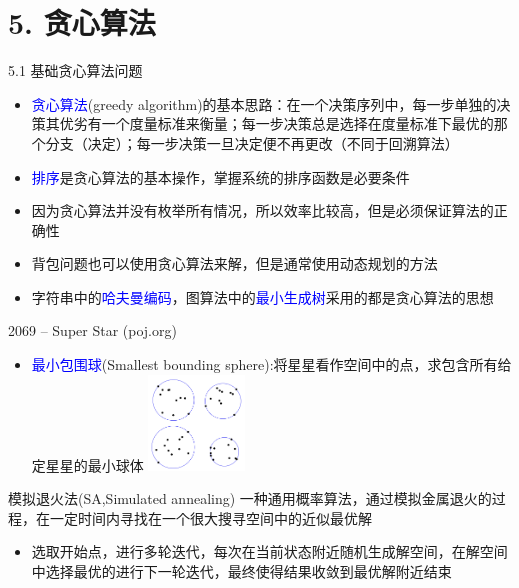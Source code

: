 


\frame{\titlepage}
\section{5. 贪心算法}
\begin{frame}{5.1 基础贪心算法问题}
    \begin{itemize}
        \item \textcolor{blue}{贪心算法}(greedy algorithm)的基本思路：在一个决策序列中，每一步单独的决策其优劣有一个度量标准来衡量；每一步决策总是选择在度量标准下最优的那个分支（决定）；每一步决策一旦决定便不再更改（不同于回溯算法）
        \item \textcolor{blue}{排序}是贪心算法的基本操作，掌握系统的排序函数是必要条件
        \item 因为贪心算法并没有枚举所有情况，所以效率比较高，但是必须保证算法的正确性
        \item 背包问题也可以使用贪心算法来解，但是通常使用动态规划的方法
        \item 字符串中的\textcolor{blue}{哈夫曼编码}，图算法中的\textcolor{blue}{最小生成树}采用的都是贪心算法的思想
    \end{itemize}
\end{frame}
\begin{frame}{2069 -- Super Star (poj.org)}
    \begin{itemize}
        \item \textcolor{blue}{最小包围球}(Smallest bounding sphere):将星星看作空间中的点，求包含所有给定星星的最小球体
        \vfill
        \includegraphics[width=0.2\textwidth,right]{fig/5-1.png}
    \end{itemize}
    \begin{block}{模拟退火法(SA,Simulated annealing)}
        \quad 一种通用概率算法，通过模拟金属退火的过程，在一定时间内寻找在一个很大搜寻空间中的近似最优解
    \end{block}
    \begin{itemize}
        \item 选取开始点，进行多轮迭代，每次在当前状态附近随机生成解空间，在解空间中选择最优的进行下一轮迭代，最终使得结果收敛到最优解附近结束
    \end{itemize}
\end{frame}
